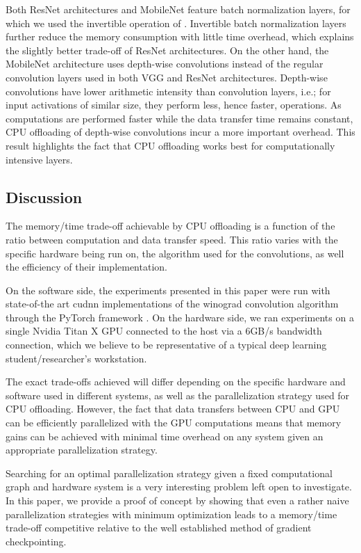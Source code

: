 \documentclass[11pt,onecolumn]{article}
\begin{document}
Both ResNet architectures and MobileNet \cite{howard2017mobilenets} feature batch normalization layers, 
for which we used the invertible operation of \cite{rota2018place}. 
Invertible batch normalization layers further reduce the memory consumption 
with little time overhead, which explains the slightly better trade-off of ResNet architectures.
On the other hand, the MobileNet architecture uses depth-wise convolutions instead of the 
regular convolution layers used in both VGG and ResNet architectures.
Depth-wise convolutions have lower arithmetic intensity \cite{wu2018shift} than convolution layers,
i.e.; for input activations of similar size, they perform less, hence faster, operations. 
As computations are performed faster while the data transfer time remains constant,
CPU offloading of depth-wise convolutions incur a more important overhead.
This result highlights the fact that CPU offloading works best for computationally
intensive layers.

\subsection{Discussion}

The memory/time trade-off achievable by CPU offloading is a function of the ratio 
between computation and data transfer speed. 
This ratio varies with the specific hardware
being run on, the algorithm used for the convolutions, 
as well the efficiency of their implementation.

On the software side, the experiments presented in this paper were run 
with state-of-the art cudnn implementations of the winograd convolution 
algorithm through the PyTorch framework \cite{paszke2017automatic}.
On the hardware side, we ran experiments on a single 
Nvidia Titan X GPU connected to the host via a 6GB/s bandwidth connection, 
which we believe to be representative of a typical deep learning student/researcher's workstation.

The exact trade-offs achieved will differ depending on the specific hardware and software used in 
different systems, as well as the parallelization strategy used for CPU offloading. 
However, the fact that data transfers between CPU and GPU can be efficiently parallelized with the GPU computations
means that memory gains can be achieved with minimal time overhead 
on any system given an appropriate parallelization strategy.  

Searching for an optimal parallelization strategy given a fixed computational graph and hardware system
is a very interesting problem left open to investigate. 
In this paper, we provide a proof of concept by showing that 
even a rather naive parallelization strategies with minimum optimization
leads to a memory/time trade-off competitive relative to 
the well established method of gradient checkpointing.
\end{document}
